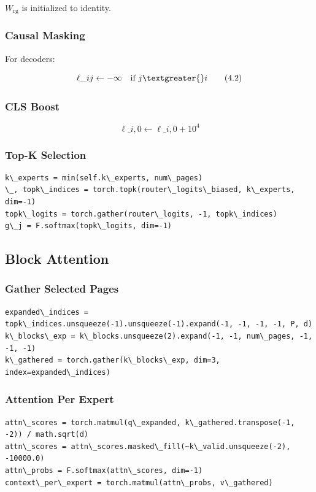 $W_\text{rg}$ is initialized to identity.

\subsubsection{Causal Masking}

For decoders:

\[
\ell\_{ij} \leftarrow -\infty \quad \text{if } j \textgreater{} i
\tag{4.2}
\]

\subsubsection{CLS Boost}

\[
\ell\_{i, 0} \leftarrow \ell\_{i, 0} + 10^4
\tag{4.3}
\]

\subsubsection{Top-K Selection}

\begin{lstlisting}
k\_experts = min(self.k\_experts, num\_pages)
\_, topk\_indices = torch.topk(router\_logits\_biased, k\_experts, dim=-1)
topk\_logits = torch.gather(router\_logits, -1, topk\_indices)
g\_j = F.softmax(topk\_logits, dim=-1)
\end{lstlisting}

\subsection{Block Attention}

\subsubsection{Gather Selected Pages}

\begin{lstlisting}
expanded\_indices = topk\_indices.unsqueeze(-1).unsqueeze(-1).expand(-1, -1, -1, -1, P, d)
k\_blocks\_exp = k\_blocks.unsqueeze(2).expand(-1, -1, num\_pages, -1, -1, -1)
k\_gathered = torch.gather(k\_blocks\_exp, dim=3, index=expanded\_indices)
\end{lstlisting}

\subsubsection{Attention Per Expert}

\begin{lstlisting}
attn\_scores = torch.matmul(q\_expanded, k\_gathered.transpose(-1, -2)) / math.sqrt(d)
attn\_scores = attn\_scores.masked\_fill(~k\_valid.unsqueeze(-2), -10000.0)
attn\_probs = F.softmax(attn\_scores, dim=-1)
context\_per\_expert = torch.matmul(attn\_probs, v\_gathered)
\end{lstlisting}

